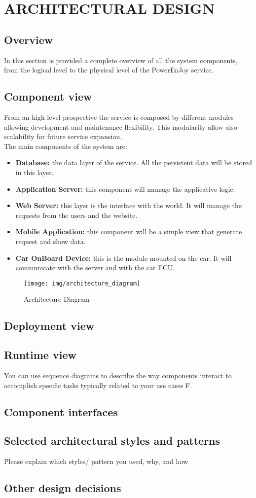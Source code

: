 \section{ARCHITECTURAL DESIGN}
\subsection{Overview}
In this section is provided a complete overview of all the system components, from the logical level to the physical level of the PowerEnJoy service.

\subsection{Component view} 
From an high level prospective the service is composed by different modules allowing development and maintenance flexibility.
This modularity allow also scalability for future service expansion, 
\\The main components of the system are:
\begin{itemize}
\item{\textbf{Database:}} the data layer of the service. All the persistent data will be stored in this layer.
\item{\textbf{Application Server:}} this component will manage the applicative logic.
\item{\textbf{Web Server:}} this layer is the interface with the world. It will manage the requests from the users and the website.
\item{\textbf{Mobile Application:}} this component will be a simple view that generate request and show data. 
\item{\textbf{Car OnBoard Device:}} this is the module mounted on the car. It will communicate with the server and with the car ECU.
\end{itemize}




	
	\begin{figure}[H]	
	\centering
	\texttt{[image: img/architecture\_diagram]}
	\caption{Architecture Diagram}
\end{figure}


\subsection{Deployment view}
\subsection{Runtime view}
You can use sequence diagrams to describe the way components interact to accomplish specific tasks typically related to your use cases F. 
\subsection{Component interfaces} 
\subsection{Selected architectural styles and patterns}
Please explain which styles/ pattern you used, why, and how
\subsection{Other design decisions }